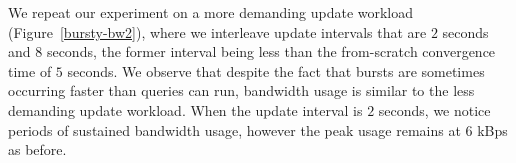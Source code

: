 We repeat our experiment on a more demanding update workload
(Figure~\ref{bursty-bw2}), where we interleave update intervals that
are $2$ seconds and $8$ seconds, the former interval being less than
the from-scratch convergence time of $5$ seconds. We observe that
despite the fact that bursts are sometimes occurring faster than
queries can run, bandwidth usage is similar to the less
demanding update workload. When the update interval is $2$ seconds, we
notice periods of sustained bandwidth usage, however the peak
usage remains at $6$ kBps as before.




 












